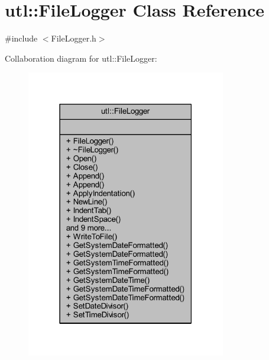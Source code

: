 \hypertarget{classutl_1_1_file_logger}{}\section{utl\+:\+:File\+Logger Class Reference}
\label{classutl_1_1_file_logger}


{\ttfamily \#include $<$File\+Logger.\+h$>$}



Collaboration diagram for utl\+:\+:File\+Logger\+:\nopagebreak
\begin{figure}[H]
\begin{center}
\leavevmode
\includegraphics[width=247pt]{classutl_1_1_file_logger__coll__graph}
\end{center}
\end{figure}
